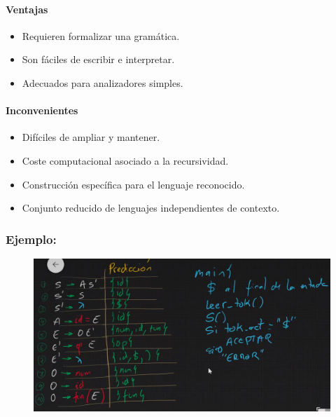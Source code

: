 \documentclass[12pt, twoside, openright]{report} %
\begin{document}
\paragraph{Ventajas}

\begin{itemize}

\item
  Requieren formalizar una gramática.
\item
  Son fáciles de escribir e interpretar.
\item
  Adecuados para analizadores simples.
\end{itemize}


\paragraph{Inconvenientes}

\begin{itemize}

\item
  Difíciles de ampliar y mantener.
\item
  Coste computacional asociado a la recursividad.
\item
  Construcción específica para el lenguaje reconocido.
\item
  Conjunto reducido de lenguajes independientes de contexto.
\end{itemize}
 
\pagebreak

\subsubsection{Ejemplo:}

\begin{figure}[H]
	{\includegraphics[scale=.4]{2021-03-26 17_49_53-Ejercicio descendente recursivo.png}}
\end{figure}
\end{document}
